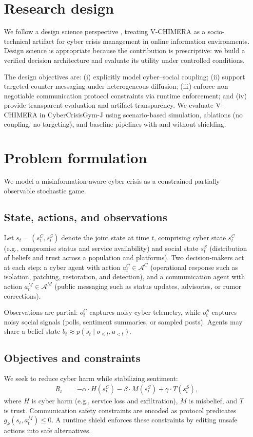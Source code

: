 \documentclass[sn-basic]{sn-jnl}
\newcommand{\model}{V-CHIMERA}
\newcommand{\envname}{CyberCrisisGym-J}
\begin{document}
\section{Research design}
We follow a design science perspective \citep{hevner2004designscience,peffers2007dsrm}, treating \model{} as a socio-technical artifact for cyber crisis management in online information environments. Design science is appropriate because the contribution is prescriptive: we build a verified decision architecture and evaluate its utility under controlled conditions.

The design objectives are: (i) explicitly model cyber--social coupling; (ii) support targeted counter-messaging under heterogeneous diffusion; (iii) enforce non-negotiable communication protocol constraints via runtime enforcement; and (iv) provide transparent evaluation and artifact transparency. We evaluate \model{} in \envname{} using scenario-based simulation, ablations (no coupling, no targeting), and baseline pipelines with and without shielding.

\section{Problem formulation}
We model a misinformation-aware cyber crisis as a constrained partially observable stochastic game.

\subsection{State, actions, and observations}
Let $s_t = (s^C_t, s^S_t)$ denote the joint state at time $t$, comprising cyber state $s^C_t$ (e.g., compromise status and service availability) and social state $s^S_t$ (distribution of beliefs and trust across a population and platforms). Two decision-makers act at each step: a cyber agent with action $a^C_t \in \mathcal{A}^C$ (operational response such as isolation, patching, restoration, and detection), and a communication agent with action $a^M_t \in \mathcal{A}^M$ (public messaging such as status updates, advisories, or rumor corrections).

Observations are partial: $o^C_t$ captures noisy cyber telemetry, while $o^S_t$ captures noisy social signals (polls, sentiment summaries, or sampled posts). Agents may share a belief state $b_t \approx p(s_t \mid o_{\le t}, a_{<t})$.

\subsection{Objectives and constraints}
We seek to reduce cyber harm while stabilizing sentiment:
\begin{align}
R_t &= -\alpha \cdot H(s^C_t) - \beta \cdot M(s^S_t) + \gamma \cdot T(s^S_t),
\end{align}
where $H$ is cyber harm (e.g., service loss and exfiltration), $M$ is misbelief, and $T$ is trust. Communication safety constraints are encoded as protocol predicates $g_k(s_t,a^M_t) \le 0$. A runtime shield enforces these constraints by editing unsafe actions into safe alternatives.
\end{document}
